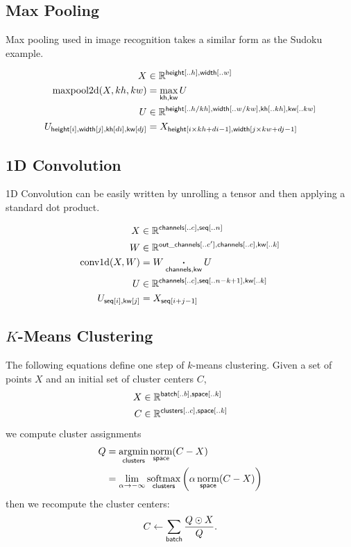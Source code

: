 \documentclass{article}
\newcommand{\reals}{\mathbb{R}}
\begin{document}
\subsection{Max Pooling}

Max pooling used in image recognition takes a similar form as the Sudoku example.

\begin{align*} 
X &\in \reals^{\nset{height}{..h}, \nset{width}{..w}} \\
\text{maxpool2d}(X, kh, kw) &=  \nfun{kh, kw}{max} U \\
U &\in \reals^{{\nset{height}{..h / kh}, \nset{width}{..w / kw}, \nset{kh}{..kh}, \nset{kw}{..kw}}} \\
U_{\nidx{height}{i}, \nidx{width}{j}, \nidx{kh}{di}, \nidx{kw}{dj}} & = X_{\nidx{height}{i \times kh + di -1}, \nidx{width}{j \times kw + dj -1}}  
\end{align*}



\subsection{1D Convolution}

1D Convolution can be easily written by unrolling a tensor and then
applying a standard dot product.

\begin{align*} 
X &\in \reals^{{\nset{channels}{..c}, \nset{seq}{..n}}}  \\
W &\in \reals^{{\nset{out\_channels}{..c'}, \nset{channels}{..c}, \nset{kw}{..k}}}  \\
\text{conv1d}(X, W) &= W \ndot{channels, kw} U \\
U &\in \reals^{{\nset{channels}{..c}, \nset{seq}{..n-k +1}, \nset{kw}{..k}}}  \\
U_{\nidx{seq}{i}, \nidx{kw}{j}} & = X_{\nidx{seq}{i+j - 1}}  
\end{align*} 


\subsection{$K$-Means Clustering}

The following equations define one step of $k$-means clustering. Given a set of points $X$ and an initial set of cluster centers $C$,
\begin{align*} 
X &\in \reals^{\nset{batch}{..b}, \nset{space}{..k}} \\
C &\in \reals^{\nset{clusters}{..c}, \nset{space}{..k}}
\end{align*}
we compute cluster assignments
\begin{align*}
Q &= \nfun{clusters}{argmin} \nfun{space}{norm}(C-X) \\
  &= \lim_{\alpha \rightarrow -\infty} \nfun{clusters}{softmax} \left(\alpha \nfun{space}{norm}(C-X)\right)
\end{align*}
then we recompute the cluster centers:
\begin{equation*}
C \leftarrow \nsum{batch} \frac{Q \odot X}{Q}.
\end{equation*}
\end{document}

